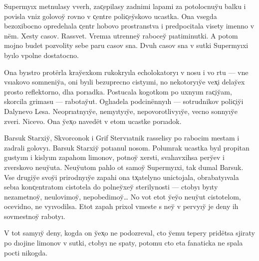 \documentclass[12pt]{book}
\begin{document}
\newcommand{\e}{ë}
\newcommand{\yi}{\mbox{y\hspace{-0.55pt}ı}}
\newcommand{\ia}{\mbox{ı\hspace{-0.55pt}a}}
\newcommand{\io}{\mbox{ı\hspace{-0.55pt}o}}
\newcommand{\y}{y̆}
\newcommand{\Y}{Y̆}

\newcommand{\yf}{y̆}

\newcommand{\X}{X̹}
\newcommand{\x}{x̹}
\newcommand{\C}{C̹}
\renewcommand{\c}{c̹}

Superm{\yi}x metnulasy vverh, za{\c}epilasy zadnimi lapami za potolocnu{\y}u balku i povisla vniz go\-lo\-vo{\y} rovno v {\c}entre poli{\c}e{\y}skovo ucastka. Ona vsegda bez\-oxi\-boc\-no opredel{\ia}la {\c}entr l{\io}bovo prostranstva i predpocitala visety imenno v n{\e}m. Xesty casov. Rassvet. Vrem{\ia} utrenne{\y} raboce{\y} p{\ia}\-ti\-mi\-nut\-ki. A potom mojno budet pozvolity sebe paru casov sna. Dvuh casov sna v sutki Superm{\yi}xi b{\yi}lo vpolne dostatocno.

Ona b{\yi}stro prot{\e}rla kra{\y}exkom rukokr{\yi}la echolokator{\yi} v nosu i vo rtu — vne vs{\ia}kovo somneni{\y}a, oni b{\yi}li bezuprecno cist{\yi}mi, no nekotor{\yi}{\y}e ve{\x}i dela{\y}ex prosto reflektorno, dl{\ia} por{\ia}dka. Postucala kogotkom po uxn{\yi}m ra{\c}i{\y}am, skorcila grimasu — rabota{\y}ut. Ogl{\ia}dela podcin{\e}nn{\yi}h — sotrudnikov poli{\c}i{\y}i Dalynevo Lesa. Neopr{\ia}tn{\yi}{\y}e, nem{\yi}t{\yi}{\y}e, nepovorotliv{\yi}{\y}e, vecno sonn{\yi}{\y}e zveri. Nicevo. Ona {\y}e{\x}o naved{\e}t v etom ucastke por{\ia}dok.

Barsuk Starxi{\y}, Skvorconok i Grif Sterv{\ia}tnik rasselisy po rabocim mestam i zadrali golov{\yi}. Barsuk Starxi{\y} pot{\ia}nul nosom. Polumrak ucastka b{\yi}l propitan gust{\yi}m i kisl{\yi}m zapahom limonov, potno{\y} xersti, sval{\ia}vxihsa per{\y}ev i zverskovo neu{\y}uta. Neu{\y}utom pahlo ot samo{\y} Superm{\yi}xi, tak dumal Barsuk. Vse drugi{\y}e svo{\y}i prirodn{\yi}{\y}e zapahi ona t{\x}atelyno unictojala, obrabat{\yi}vala seb{\ia} kon{\c}entratom cistotela do polne{\y}xe{\y} sterilynosti — ctob{\yi} b{\yi}ty nezametno{\y}, neulovimo{\y}, nepobedimo{\y}… No vot etot {\y}e{\y}o neu{\y}ut cistotelom, ocevidno, ne v{\yi}vodilsa. Etot zapah prixol vmeste s ne{\y} v perv{\yi}{\y} je deny ih sovmestno{\y} rabot{\yi}.

V tot sam{\yi}{\y} deny, kogda on {\y}e{\x}o ne podozreval, cto {\y}emu tepery prid{\e}tsa sjiraty po d{\io}jine limonov v sutki, ctob{\yi} ne spaty, potomu cto eta fanaticka ne spala pocti nikogda.
\end{document}
